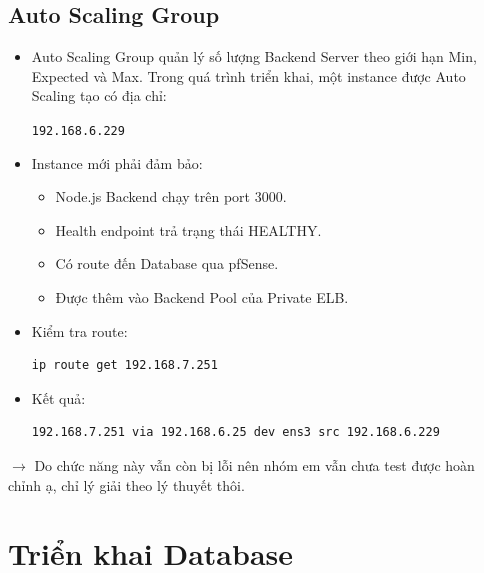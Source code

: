 \documentclass[12pt, a4paper]{article}
\begin{document}
\subsection{Auto Scaling Group}

\begin{itemize}


\item Auto Scaling Group quản lý số lượng Backend Server
theo giới hạn Min, Expected và Max. Trong quá trình triển khai, một instance được Auto Scaling tạo có địa chỉ:

\begin{center}
\texttt{192.168.6.229}
\end{center}

\item Instance mới phải đảm bảo:

\begin{itemize}
    \item Node.js Backend chạy trên port 3000.
    \item Health endpoint trả trạng thái HEALTHY.
    \item Có route đến Database qua pfSense.
    \item Được thêm vào Backend Pool của Private ELB.
\end{itemize}

\item Kiểm tra route:

\begin{lstlisting}[language=bash]
ip route get 192.168.7.251
\end{lstlisting}

\item Kết quả:

\begin{lstlisting}
192.168.7.251 via 192.168.6.25 dev ens3 src 192.168.6.229
\end{lstlisting}

\end{itemize}

\noindent $\rightarrow$ Do chức năng này vẫn còn bị lỗi nên nhóm em vẫn chưa test được hoàn chỉnh ạ, chỉ lý giải theo lý thuyết thôi.


\section{Triển khai Database}
\end{document}
